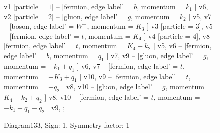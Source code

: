 \documentclass{revtex4}
\begin{document}
\begin{figure}[!htb]
\begin{center}
{    %
v1 [particle = \(1\)] -- [fermion, edge label' = \(b\), momentum = \(k_{1}\) ] v6, 
v2 [particle = \(2\)] -- [gluon, edge label' = \(g\), momentum = \(k_{2}\) ] v5, 
v7 -- [boson, edge label' = \(W^{-}\), momentum = \(K_{3}\) ] v3 [particle = \(3\)], 
v5 -- [fermion, edge label' = \(t\), momentum = \(K_{4}\) ] v4 [particle = \(4\)], 
v8 -- [fermion, edge label' = \(t\), momentum = \(K_{4} - k_{2}\) ] v5, 
v6 -- [fermion, edge label' = \(b\), momentum = \(q_{1}\) ] v7, 
v9 -- [gluon, edge label' = \(g\), momentum = \(-k_{1} + q_{1}\) ] v6, 
v7 -- [fermion, edge label' = \(t\), momentum = \(-K_{3} + q_{1}\) ] v10, 
v9 -- [fermion, edge label' = \(t\), momentum = \(-q_{2}\) ] v8, 
v10 -- [gluon, edge label' = \(g\), momentum = \(K_{4} - k_{2} + q_{2}\) ] v8, 
v10 -- [fermion, edge label' = \(t\), momentum = \(-k_{1} + q_{1} - q_{2}\) ] v9, 
};
\end{center}
\caption{Diagram133, Sign: 1, Symmetry factor: 1}
\end{figure}
\newpage
\end{document}

